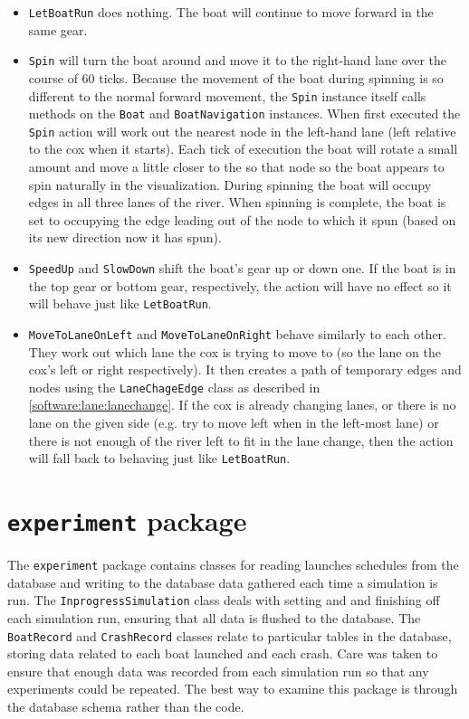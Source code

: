   \begin{itemize}
  
    \item \texttt{LetBoatRun} does nothing. The boat will continue to move forward in the same gear.
  
    \item \texttt{Spin} will turn the boat around and move it to the right-hand lane over the course of 60 ticks. Because the movement of the boat during spinning is so different to the normal forward movement, the \texttt{Spin} instance itself calls methods on the \texttt{Boat} and \texttt{BoatNavigation} instances. When first executed the \texttt{Spin} action will work out the nearest node in the left-hand lane (left relative to the cox when it starts). Each tick of execution the boat will rotate a small amount and move a little closer to the so that node so the boat appears to spin naturally in the visualization. During spinning the boat will occupy edges in all three lanes of the river. When spinning is complete, the boat is set to occupying the edge leading out of the node to which it spun (based on its new direction now it has spun).
  
    \item \texttt{SpeedUp} and \texttt{SlowDown} shift the boat's gear up or down one. If the boat is in the top gear or bottom gear, respectively, the action will have no effect so it will behave just like \texttt{LetBoatRun}.
  
    \item \texttt{MoveToLaneOnLeft} and \texttt{MoveToLaneOnRight} behave similarly to each other. They work out which lane the cox is trying to move to (so the lane on the cox's left or right respectively). It then creates a path of temporary edges and nodes using the \texttt{LaneChageEdge} class as described in \ref{software:lane:lanechange}. If the cox is already changing lanes, or there is no lane on the given side (e.g. try to move left when in the left-most lane) or there is not enough of the river left to fit in the lane change, then the action will fall back to behaving just like \texttt{LetBoatRun}.
  \end{itemize}
  
\section{\texttt{experiment} package}\label{software:experiment}
The \texttt{experiment} package contains classes for reading launches schedules from the database and writing to the database data gathered each time a
simulation is run. The
\texttt{InprogressSimulation} class deals with setting and and finishing off
each simulation run, ensuring that all data is flushed to the
database. The \texttt{BoatRecord} and \texttt{CrashRecord} classes relate to particular
tables in the database, storing data related to each boat launched and
each crash. Care was taken to ensure that enough data was recorded
from each simulation run so that any experiments could be repeated.
The best way to examine this package is through the database schema rather than the code.

